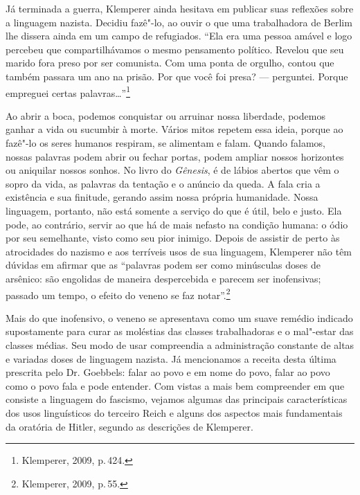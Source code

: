 Já terminada a guerra, Klemperer ainda hesitava em publicar suas
reflexões sobre a linguagem nazista. Decidiu fazê"-lo, ao ouvir o que uma
trabalhadora de Berlim lhe dissera ainda em um campo de refugiados.
``Ela era uma pessoa amável e logo percebeu que compartilhávamos o mesmo
pensamento político. Revelou que seu marido fora preso por ser
comunista. Com uma ponta de orgulho, contou que também passara um ano na
prisão. Por que você foi presa? --- perguntei. Porque empreguei certas
palavras\ldots{}''\footnote{Klemperer, 2009, p.\,424.}

Ao abrir a boca, podemos conquistar ou arruinar nossa liberdade, podemos
ganhar a vida ou sucumbir à morte. Vários mitos repetem essa ideia,
porque ao fazê"-lo os seres humanos respiram, se alimentam e falam.
Quando falamos, nossas palavras podem abrir ou fechar portas, podem
ampliar nossos horizontes ou aniquilar nossos sonhos. No livro do
\emph{Gênesis}, é de lábios abertos que vêm o sopro da vida, as palavras
da tentação e o anúncio da queda. A fala cria a existência e sua
finitude, gerando assim nossa própria humanidade. Nossa linguagem,
portanto, não está somente a serviço do que é útil, belo e justo. Ela
pode, ao contrário, servir ao que há de mais nefasto na condição humana:
o ódio por seu semelhante, visto como seu pior inimigo. Depois de
assistir de perto às atrocidades do nazismo e aos terríveis usos de sua
linguagem, Klemperer não têm dúvidas em afirmar que as ``palavras podem
ser como minúsculas doses de arsênico: são engolidas de maneira
despercebida e parecem ser inofensivas; passado um tempo, o efeito do
veneno se faz notar''.\footnote{Klemperer, 2009, p.\,55.}

Mais do que inofensivo, o veneno se apresentava como um suave remédio
indicado supostamente para curar as moléstias das classes trabalhadoras
e o mal"-estar das classes médias. Seu modo de usar compreendia a
administração constante de altas e variadas doses de linguagem nazista.
Já mencionamos a receita desta última prescrita pelo Dr. Goebbels: falar
ao povo e em nome do povo, falar ao povo como o povo fala e pode
entender. Com vistas a mais bem compreender em que consiste a linguagem
do fascismo, vejamos algumas das principais características dos usos
linguísticos do terceiro Reich e alguns dos aspectos mais fundamentais
da oratória de Hitler, segundo as descrições de Klemperer.

